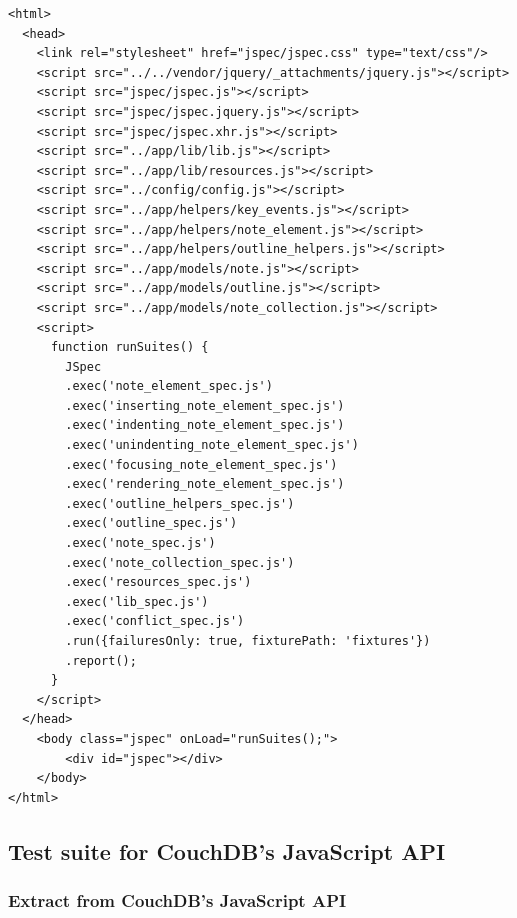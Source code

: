\lstset{language=html}
\medskip 
\begin{lstlisting}[label=code:jspec-index,caption={\fontfamily{pcr}\selectfont /\_attachments/spec/index.html}]
<html>
  <head>
    <link rel="stylesheet" href="jspec/jspec.css" type="text/css"/>
    <script src="../../vendor/jquery/_attachments/jquery.js"></script>
    <script src="jspec/jspec.js"></script>
    <script src="jspec/jspec.jquery.js"></script>
    <script src="jspec/jspec.xhr.js"></script>
    <script src="../app/lib/lib.js"></script>
    <script src="../app/lib/resources.js"></script>
    <script src="../config/config.js"></script>
    <script src="../app/helpers/key_events.js"></script>
    <script src="../app/helpers/note_element.js"></script>
    <script src="../app/helpers/outline_helpers.js"></script>
    <script src="../app/models/note.js"></script>
    <script src="../app/models/outline.js"></script>
    <script src="../app/models/note_collection.js"></script>
    <script>
      function runSuites() {
        JSpec
        .exec('note_element_spec.js')
        .exec('inserting_note_element_spec.js')
        .exec('indenting_note_element_spec.js')
        .exec('unindenting_note_element_spec.js')
        .exec('focusing_note_element_spec.js')
        .exec('rendering_note_element_spec.js')
        .exec('outline_helpers_spec.js')
        .exec('outline_spec.js')
        .exec('note_spec.js')
        .exec('note_collection_spec.js')
        .exec('resources_spec.js')
        .exec('lib_spec.js')
        .exec('conflict_spec.js')
        .run({failuresOnly: true, fixturePath: 'fixtures'})
        .report();
      }
    </script>
  </head>
	<body class="jspec" onLoad="runSuites();">
		<div id="jspec"></div>
	</body>
</html>
\end{lstlisting}










\subsection{Test suite for CouchDB's JavaScript API}
\label{subsec:httpapi}

\subsubsection{Extract from CouchDB's JavaScript API}

